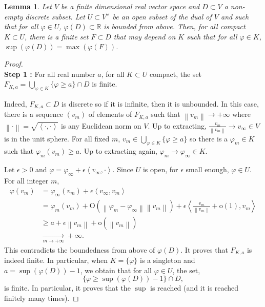 \documentclass{article}
\newtheorem{lemma}[theorem]{Lemma}
\theoremstyle{remark}
\theoremstyle{definition}
\newcommand{\R}{\mathbb{R}}
\newcommand{\tend}[2]{\underset{#1 \rightarrow #2}{\longrightarrow}}
\newcommand{\scal}[2]{\left< #1,#2 \right>}
\newcommand{\norme}[1]{\left\| #1 \right\|}
\renewcommand{\geq}{\geqslant}
\begin{document}
\begin{lemma}\label{LEM:Finitude locale}
    Let $V$ be a finite dimensional real vector space and $D \subset V$ a non-empty discrete subset. Let $U \subset V^\lor$ be an open subset of the dual of $V$ and such that for all $\varphi \in U$, $\varphi(D) \subset \R$ is bounded from above. Then, for all compact $K \subset U$, there is a finite set $F \subset D$ that may depend on $K$ such that for all $\varphi \in K$, $\sup(\varphi(D)) = \max(\varphi(F))$.
\end{lemma}
\begin{proof}\ \\
\vspace{1mm}
\noindent\textbf{Step 1 :} For all real number $a$, for all $K \subset U$ compact, the set $F_{K,a} = \bigcup_{\varphi \in K} \{\varphi \geq a\} \cap D$ is finite.
\vspace{1mm}

Indeed, $F_{K,a} \subset D$ is discrete so if it is infinite, then it is unbounded. In this case, there is a sequence $(v_m)$ of elements of $F_{K,a}$ such that $\norme{v_m} \rightarrow +\infty$ where $\norme{\cdot} = \sqrt{\scal{\cdot}{\cdot}}$ is any Euclidean norm on $V$. Up to extracting, $\frac{v_m}{\norme{v_m}} \rightarrow v_\infty \in V$ is in the unit sphere. For all fixed $m$, $v_m \in \bigcup_{\varphi \in K} \{\varphi \geq a\}$ so there is a $\varphi_m \in K$ such that $\varphi_m(v_m) \geq a$. Up to extracting again, $\varphi_m \rightarrow \varphi_\infty \in K$.

Let $\epsilon > 0$ and $\varphi = \varphi_\infty + \epsilon\scal{v_\infty}{\cdot}$. Since $U$ is open, for $\epsilon$ small enough, $\varphi \in U$. For all integer $m$,
\begin{align*}
    \varphi(v_m) & = \varphi_\infty(v_m) + \epsilon\scal{v_\infty}{v_m}\\
    & = \varphi_m(v_m) + \mathrm{O}(\norme{\varphi_m - \varphi_\infty}\norme{v_m}) + \epsilon\scal{\frac{v_m}{\norme{v_m}} + \mathrm{o}(1)}{v_m}\\
    & \geq a + \epsilon\norme{v_m} + \mathrm{o}(\norme{v_m})\\
    & \tend{m}{+\infty} +\infty.
\end{align*}
This contradicts the boundedness from above of $\varphi(D)$. It proves that $F_{K,a}$ is indeed finite. In particular, when $K = \{\varphi\}$ is a singleton and $a = \sup(\varphi(D)) - 1$, we obtain that for all $\varphi \in U$, the set,
$$
\{\varphi \geq \sup(\varphi(D)) - 1\} \cap D,
$$
is finite. In particular, it proves that the $\sup$ is reached (and it is reached finitely many times).


\end{proof}
\end{document}
